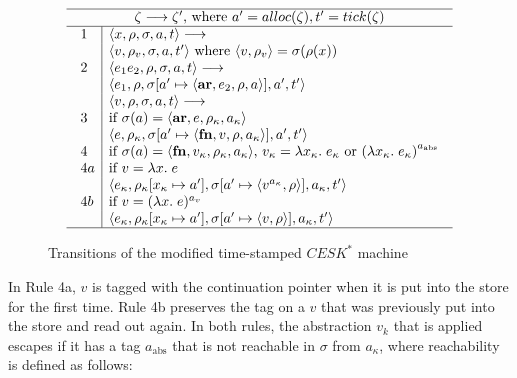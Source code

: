 \RequirePackage[hyphens]{url}\documentclass[12pt,oneside]{amsart}
\newcommand{\kw}[1]{\mathbf{#1}}
\newcommand{\lmd}[2]{\lambda #1.\;#2}
\begin{document}
\begin{figure}[hbpt]
\[\begin{array}{c}\hline
\zeta \longrightarrow \zeta^\prime\text{, where } a^\prime = alloc(\zeta),
    t^\prime = tick(\zeta) \\ \hline
\begin{array}{l|l}
    1 & \langle x, \rho, \sigma, a, t\rangle \longrightarrow \\ &
        \langle v, \rho_v, \sigma, a, t^\prime\rangle \text{ where $\langle v, \rho_v\rangle = \sigma(\rho(x))$} \\
    2 & \langle e_1e_2, \rho, \sigma, a, t\rangle \longrightarrow \\ &
        \langle e_1, \rho, \sigma[a^\prime\mapsto\langle\kw{ar}, e_2, \rho, a\rangle], a^\prime, t^\prime\rangle \\
    & \langle v, \rho, \sigma, a, t\rangle \longrightarrow \\
    3 & \text{if $\sigma(a) = \langle\kw{ar}, e, \rho_\kappa, a_\kappa\rangle$} \\
        & \langle e, \rho_\kappa, \sigma[a^\prime\mapsto\langle\kw{fn}, v, \rho, a_\kappa\rangle], a^\prime, t^\prime\rangle \\
    4 & \text{if $\sigma(a) = \langle\kw{fn}, v_\kappa, \rho_\kappa, a_\kappa\rangle$, $v_\kappa = \lmd{x_\kappa}{e_\kappa}$ or
        $\left(\lmd{x_\kappa}{e_\kappa}\right)^{a_\text{abs}}$}\\
    4a & \text{if $v = \lmd{x}{e}$} \\
    & \langle e_\kappa, \rho_\kappa[x_\kappa\mapsto a^\prime], \sigma[a^\prime\mapsto\langle
        v^{a_\kappa}, \rho\rangle], a_\kappa, t^\prime\rangle\\
    4b & \text{if $v = (\lmd{x}{e})^{a_v}$} \\
    & \langle e_\kappa, \rho_\kappa[x_\kappa\mapsto a^\prime], \sigma[a^\prime\mapsto\langle
        v, \rho\rangle], a_\kappa, t^\prime\rangle
\end{array} \\ \hline \end{array}\]
\caption{Transitions of the modified time-stamped $CESK^\ast$ machine}
\label{fig:escape_transitions}
\end{figure}
In Rule 4a, $v$ is tagged with the continuation pointer when it is put into the store for the first time.  Rule 4b preserves the tag on a $v$ that was previously put into the store and read out again.  In both rules, the abstraction $v_k$ that is applied escapes if it has a tag $a_\text{abs}$ that is not reachable in $\sigma$ from $a_\kappa$, where reachability is defined as follows:
\end{document}
